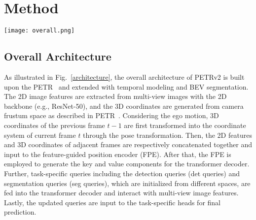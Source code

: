 \documentclass[10pt,twocolumn,letterpaper]{article}
\begin{document}
\section{Method}

\begin{figure*}[t]
	\centering  
	\texttt{[image: overall.png]}
	\caption{The paradigm of the proposed PETRv2. The 2D features are extracted by the backbone network from the multi-view images and the 3D coordinates are generated following the same way as PETR~\cite{liu2022petr}. To achieve the temporal alignment, the 3D coordinates in PETR of previous frame $t-1$ are firstly transformed through pose transformation. Then 2D image features and 3D coordinates of two frames are concatenated together and injected to feature-guided position encoder to generate the key and value components for the transformer decoder. The detection, segmentation and lane queries, initialized under different spaces, interact with the key and value components in transformer decoder. The updated queries are further used to predict the 3D bounding boxes, BEV segmentation map and the 3D lanes with task-specific heads. $\textcircled{\scriptsize A}$ is 3D coordinates alignment from  frame $t-1$ to  frame $t$. $\textcircled{\scriptsize C}$ is concatenation operation along the batch axis.}  
	\label{architecture}
\end{figure*}

\subsection{Overall Architecture}
As illustrated in Fig.~\ref{architecture}, the overall architecture of PETRv2 is built upon the PETR~\cite{liu2022petr} and extended with temporal modeling and BEV segmentation. The 2D image features are extracted from multi-view images with the 2D backbone (e.g., ResNet-50), and the 3D coordinates are generated from camera frustum space as described in PETR~\cite{liu2022petr}. Considering the ego motion, 3D coordinates of the previous frame $t-1$ are first transformed into the coordinate system of current frame $t$ through the pose transformation. Then, the 2D features and 3D coordinates of adjacent frames are respectively concatenated together and input to the feature-guided position encoder (FPE). After that, the FPE is employed to generate the key and value components for the transformer decoder.
Further, task-specific queries including the detection queries (det queries) and segmentation queries (seg queries), which are initialized from different spaces, are fed into the transformer decoder and interact with multi-view image features. Lastly, the updated queries are input to the task-specific heads for final prediction. 
\end{document}

